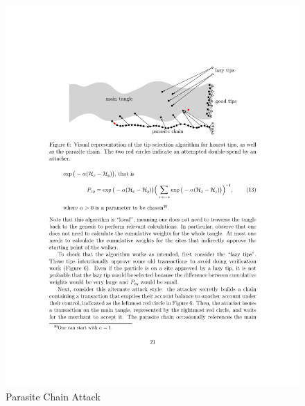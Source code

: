 \begin{figure}[H]
    \centering
    \includegraphics[width=12cm]{images/parasite-chain.pdf}
    \caption{Parasite Chain Attack \cite{the-tangle}}
    \label{fig:parasite-chain}
\end{figure}

